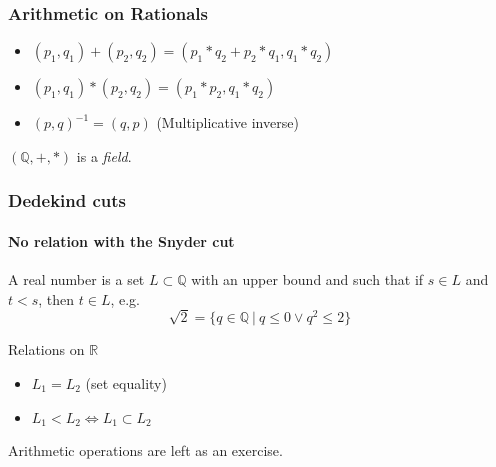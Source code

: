 \documentclass{beamer}
\def\R{\mathbb{R}}
\def\Q{\mathbb{Q}}
\begin{document}
\begin{frame}
    \frametitle{Arithmetic on Rationals}
    \begin{itemize}
        \item $(p_1,q_1) + (p_2,q_2) = (p_1*q_2 + p_2*q_1, q_1*q_2)$
        \item $(p_1,q_1) * (p_2,q_2) = (p_1*p_2,q_1*q_2)$
        \item $(p,q)^{-1} = (q,p)$ (Multiplicative inverse)
    \end{itemize}

    \vspace{2.5em}
    $(\Q, +, *)$ is a \textit{field}.
\end{frame}

\begin{frame}
    \frametitle{Dedekind cuts}
    \framesubtitle{No relation with the Snyder cut}
    A real number is a set $L \subset \Q$ with an upper bound and such that if $s \in L$ and $t < s$, then $t \in L$, e.g.
    $$ \sqrt{2} = \{ q \in \Q ~|~ q \le 0 \vee q^2 \le 2 \} $$

    \vspace{2.5em}
    Relations on $\R$
    \begin{itemize}
        \item $L_1 = L_2$ (set equality)
        \item $L_1 < L_2 \Leftrightarrow L_1 \subset L_2$
    \end{itemize}

    Arithmetic operations are left as an exercise.
\end{frame}
\end{document}
